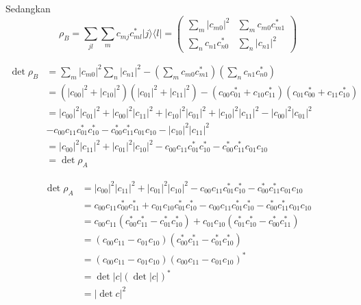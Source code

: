 Sedangkan
\begin{equation}
	\rho_B
	= \sum_{j l} \sum_m c_{m j} c^{*}_{m l} | j \rangle \langle l |
	= \begin{pmatrix}
		\sum_m |c_{m0}|^2 & \sum_m c_{m0} c^{*}_{m1} \\
		\sum_n c_{n1} c^{*}_{n0} & \sum_n |c_{n1}|^2
	\end{pmatrix}
\end{equation}

\begin{equation}
	\begin{aligned}
		\det \rho_B
		&= \sum_m |c_{m0}|^2 \sum_n |c_{n1}|^2
		- \left( \sum_m c_{m0} c^{*}_{m1} \right)
		\left( \sum_n c_{n1} c^{*}_{n0} \right)\\
		&= (|c_{00}|^2 + |c_{10}|^2)(|c_{01}|^2 + |c_{11}|^2)
		- (c_{00} c^{*}_{01} + c_{10} c^{*}_{11})
		(c_{01} c^{*}_{00} + c_{11} c^{*}_{10})\\
		&= |c_{00}|^2 |c_{01}|^2
		+ |c_{00}|^2 |c_{11}|^2
		+ |c_{10}|^2 |c_{01}|^2
		+ |c_{10}|^2 |c_{11}|^2- |c_{00}|^2 |c_{01}|^2\\
		&- c_{00} c_{11} c^{*}_{01} c^{*}_{10}
		- c^{*}_{00} c^{*}_{11} c_{01} c_{10}- |c_{10}|^2 |c_{11}|^2\\
		&= |c_{00}|^2 |c_{11}|^2
		+ |c_{01}|^2 |c_{10}|^2
		- c_{00} c_{11} c^{*}_{01} c^{*}_{10}
		- c^{*}_{00} c^{*}_{11} c_{01} c_{10}\\
		&= \det \rho_A
	\end{aligned}
\end{equation}

\begin{equation}
	\begin{aligned}
		\det \rho_A
		&= |c_{00}|^2 |c_{11}|^2
		+ |c_{01}|^2 |c_{10}|^2
		- c_{00} c_{11} c^{*}_{01} c^{*}_{10}
		- c^{*}_{00} c^{*}_{11} c_{01} c_{10}\\
		&=c_{00} c_{11} c^{*}_{00} c^{*}_{11}
		+ c_{01} c_{10} c^{*}_{01} c^{*}_{10}-c_{00} c_{11} c^{*}_{01} c^{*}_{10}-c^{*}_{00} c^{*}_{11}c_{01} c_{10} \\
		&= c_{00}c_{11}(c^{*}_{00} c^{*}_{11} - c^{*}_{01} c^{*}_{10})+c_{01}c_{10}(c^{*}_{01} c^{*}_{10} - c^{*}_{00} c^{*}_{11})\\
		&= (c_{00} c_{11} - c_{01} c_{10})
		(c^{*}_{00} c^{*}_{11} - c^{*}_{01} c^{*}_{10})\\
		&= (c_{00} c_{11} - c_{01} c_{10})
		(c_{00} c_{11} - c_{01} c_{10})^{*}\\
		&= \det |c| (\det |c|)^{*}\\
		&= |\det c|^2
	\end{aligned}
\end{equation}

